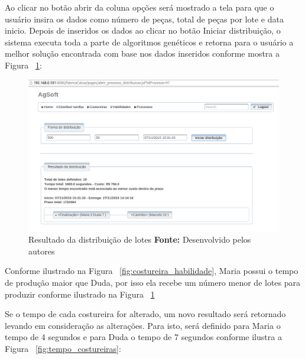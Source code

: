 \par Ao clicar no botão abrir da coluna opções será mostrado a tela para que o
usuário insira os dados como número de peças, total de peças por lote e data inicio. Depois de
inseridos os dados ao clicar no botão Iniciar distribuição, o sistema executa
toda a parte de algoritmos genéticos e retorna para o usuário a melhor solução
encontrada com base nos dados inseridos conforme mostra a Figura
~\ref{fig:resultado_distribuicao_teste1}:


\begin{figure}[h!]
	\centerline{\includegraphics[scale=0.4]{./imagens/resultado_distribuicao_teste1.png}}
	\caption[Resultado da distribuição de lotes]
	{Resultado da distribuição de lotes \textbf{Fonte:} Desenvolvido pelos autores}
	\label{fig:resultado_distribuicao_teste1}
\end{figure}

\par Conforme ilustrado na Figura ~\ref{fig:costureira_habilidade}, Maria possui
o tempo de produção maior que Duda, por isso ela recebe um número menor de lotes
para produzir conforme ilustrado na Figura
~\ref{fig:resultado_distribuicao_teste1}

\par Se o tempo de cada costureira for alterado, um novo resultado será
retornado levando em consideração as alterações. Para isto, será definido para
Maria o tempo de 4 segundos e para Duda o tempo de 7 segundos conforme ilustra a
Figura ~\ref{fig:tempo_costureiras}: 

\newpage

